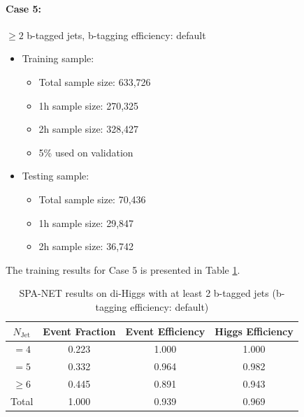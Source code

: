 \documentclass[12pt]{article}
\begin{document}
		\paragraph{Case 5:}$\ge 2$ b-tagged jets, b-tagging efficiency: default 
		\begin{itemize}
			\item Training sample:
			\begin{itemize}
				\item Total sample size: 633,726
				\item 1h sample size: 270,325
				\item 2h sample size: 328,427
				\item 5\% used on validation
			\end{itemize}
			\item Testing sample: 
				\begin{itemize}
					\item Total sample size: 70,436
					\item 1h sample size: 29,847
					\item 2h sample size: 36,742
				\end{itemize}
		\end{itemize}
		The training results for Case 5 is presented in Table \ref{tab:SPANet_2btag_default}.
		\begin{table}[htpb]
			\centering
			\caption{SPA-NET results on di-Higgs with at least 2 b-tagged jets (b-tagging efficiency: default)}
			\label{tab:SPANet_2btag_default}
			\begin{tabular}{c|c|cc}
				$N_\text{Jet}$ & Event Fraction & Event Efficiency & Higgs Efficiency \\
				\hline
				$=4$	  &   0.223             &     1.000             &  1.000        \\
				$=5$	  &   0.332             &     0.964             &  0.982        \\
				$\ge 6$	  &   0.445             &     0.891             &  0.943        \\
				Total	  &   1.000             &     0.939             &  0.969        \\
			\end{tabular}
		\end{table}
\end{document}
